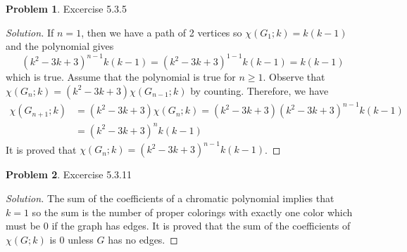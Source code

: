 \documentclass[12pt]{article}
\theoremstyle{definition}
\newtheorem{problem}{Problem}
\newenvironment*{solution}{\begin{proof}[Solution]}{\end{proof}}
\begin{document}
\begin{problem}
    Excercise 5.3.5
\end{problem}
\begin{solution}
    If \(n=1\), then we have a path of 2 vertices so \(\chi(G_1;k)=k(k-1)\)
    and the polynomial gives
    \[(k^2-3k+3)^{n-1}k(k-1) = (k^2-3k+3)^{1-1}k(k-1) = k(k-1)\]
    which is true.
    Assume that the polynomial is true for \(n\geq1\).
    Observe that \(\chi(G_n;k)=(k^2-3k+3)\chi(G_{n-1};k)\) by counting.
    Therefore, we have
    \begin{align*}
        \chi(G_{n+1};k) &= (k^2-3k+3)\chi(G_{n};k)
        = (k^2-3k+3)(k^2-3k+3)^{n-1}k(k-1) \\
        &= (k^2-3k+3)^nk(k-1)
    \end{align*}
    It is proved that \(\chi(G_n;k) = (k^2-3k+3)^{n-1}k(k-1)\).
\end{solution}

\begin{problem}
    Excercise 5.3.11
\end{problem}
\begin{solution}
    The sum of the coefficients of a chromatic polynomial implies that \(k=1\)
    so the sum is the number of proper colorings with exactly one color which
    must be 0 if the graph has edges.
    It is proved that the sum of the coefficients of \(\chi(G;k)\) is 0 unless
    \(G\) has no edges.
\end{solution}
\end{document}
